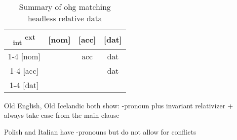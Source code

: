  \begin{table}[H]
   \center
   \caption {Summary of \ac{ohg} matching headless relative data}
 		\begin{tabular}{c|c|c|c}
 		  \toprule
 			\textsubscript{\ac{int}} \textsuperscript{\ac{ext}}
 		        & [\ac{nom}]
 		        & [\ac{acc}]
 		        & [\ac{dat}]
 		        \\ \cmidrule{1-4}
 		    [\ac{nom}]
 		        &
 		        & \ac{acc}
 		        & \ac{dat}
 		        \\ \cmidrule{1-4}
 		    [\ac{acc}]
 		        &
 		        &
 		        & \ac{dat}
 		        \\ \cmidrule{1-4}
 		    [\ac{dat}]
 		        &
 		        &
 		        &
 		        \\
 		  \bottomrule
 		\end{tabular}
 \end{table}



Old English, Old Icelandic both show: -pronoun plus invariant relativizer + always take case from the main clause

Polish and Italian have -pronouns but do not allow for conflicts
